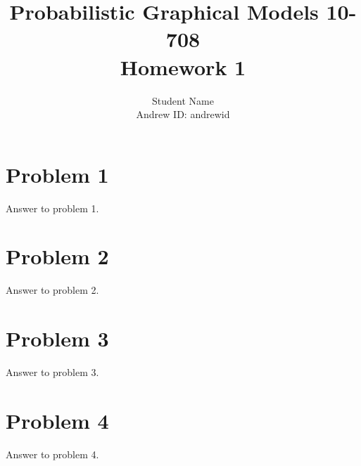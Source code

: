 \documentclass{article}
\title{ \vspace{-5mm}
        Probabilistic Graphical Models 10-708\\
        Homework 1}         %
\author{Student Name\\      %
Andrew ID: andrewid}        %
\begin{document}
\maketitle



\section*{Problem 1}
Answer to problem 1.




\section*{Problem 2}
Answer to problem 2.




\section*{Problem 3}
Answer to problem 3.




\section*{Problem 4}
Answer to problem 4.
\end{document}
